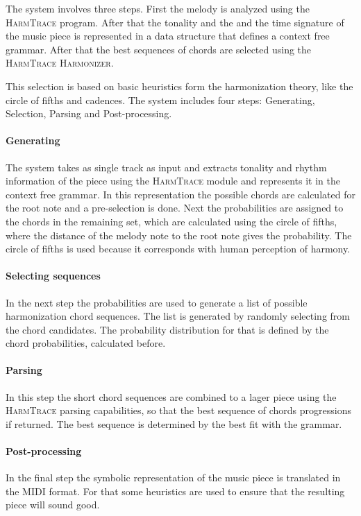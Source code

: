 The system involves three steps. First the melody is analyzed using the \textsc{HarmTrace} program. After that the tonality and the and the time signature of the music piece is represented in a data structure that defines a context free grammar. After that the best sequences of chords are selected using the \textsc{HarmTrace Harmonizer}. 

This selection is based on basic heuristics form the harmonization theory, like the circle of fifths and cadences. The system includes four steps: Generating, Selection, Parsing and Post-processing. 

\paragraph{Generating} 
The system takes as single track as input and extracts tonality and rhythm information of the piece using the \textsc{HarmTrace} module and represents it in the context free grammar. In this representation the possible chords are calculated for the root note and a pre-selection is done. Next the probabilities are assigned to the chords in the remaining set, which are calculated using the circle of fifths, where the distance of the melody note to the root note gives the probability. The circle of fifths is used because it corresponds with human perception of harmony. 

\paragraph{Selecting sequences}
In the next step the probabilities are used to generate a list of possible harmonization chord sequences. The list is generated by randomly selecting from the chord candidates. The probability distribution for that is defined by the chord probabilities, calculated before. 

\paragraph{Parsing}
In this step the short chord sequences are combined to a lager piece using the \textsc{HarmTrace} parsing capabilities, so that the best sequence of chords progressions if returned. The best sequence is determined by the best fit with the grammar.

\paragraph{Post-processing}
In the final step the symbolic representation of the music piece is translated in the MIDI format. For that some heuristics are used to ensure that the resulting piece will sound good. 

